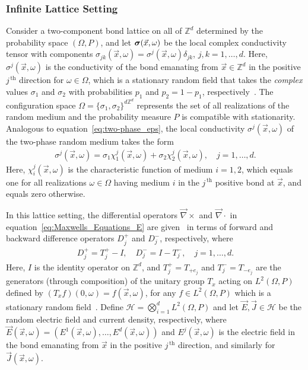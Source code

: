 \documentclass{cmslatex}
\newcommand\bsig{\mbox{\boldmath${\sigma}$}}
\begin{document}
\subsubsection{Infinite Lattice Setting}
\label{sec:Infinite_Lattice_Setting}
%
Consider a two-component bond lattice on all of $\mathbb{Z}^d$
determined by the probability space $(\Omega,P)$, and let
$\bsig(\vec{x},\omega)$ be the local complex conductivity tensor with
components $\sigma_{jk}(\vec{x},\omega)=\sigma^j(\vec{x},\omega)\delta_{jk}$, $j,k=1,\ldots,d$. Here,
$\sigma^j(\vec{x},\omega)$ is the conductivity of the bond emanating from 
$\vec{x}\in\mathbb{Z}^d$ in the positive $j^{\,\text{th}}$ direction for
$\omega\in\Omega$, which is a stationary random field that takes the
\emph{complex} values $\sigma_1$ and $\sigma_2$ with probabilities $p_1$ and
$p_2=1-p_1$, respectively~\cite{Golden:CMP-467,Bruno:JSP-365}. The
configuration space $\Omega=\{\sigma_1,\sigma_2\}^{d\mathbb{Z}^d}$ represents the set
of all realizations of the random medium and the 
probability measure $P$ is compatible with stationarity. Analogous to
equation~\eqref{eq:two-phase_eps}, the local conductivity
$\sigma^j(\vec{x},\omega)$ of the two-phase random medium takes the
form~\cite{Golden:CMP-467}  
%
\begin{align}\label{eq:two-phase_sigma}
  \sigma^j(\vec{x},\omega)=\sigma_1\chi_1^j(\vec{x},\omega)+\sigma_2\chi_2^j(\vec{x},\omega), \quad j=1,\ldots,d.
\end{align}
%
Here, $\chi_i^j(\vec{x},\omega)$ is the characteristic function of medium
$i=1,2$, which equals one for all realizations $\omega\in\Omega$ having medium $i$
in the $j^{\,\text{th}}$ positive bond at $\vec{x}$, and equals zero
otherwise.




In this lattice setting, the differential operators $\vec{\nabla}\times$ and
$\vec{\nabla}\cdot$ in equation~\eqref{eq:Maxwells_Equations_E} are
given~\cite{Golden:CMP-467,Bruno:JSP-365} in terms of forward and
backward difference operators $D_j^+$ and $D_j^-$, respectively, where
%
\begin{align}\label{eq:Difference_Operators}
  D_j^+=T_j^+-I, \quad D_j^-=I-T_j^-, \quad j=1,\ldots,d.
\end{align}
%
Here, $I$ is the identity operator on $\mathbb{Z}^d$, and 
$T_j^+=T_{+e_j}$ and $T_j^-=T_{-e_j}$ are the generators (through 
composition) of the unitary group $T_x$ acting on $L^2(\Omega,P)$ defined
by $(T_xf)(0,\omega)=f(\vec{x},\omega)$, for any $f\in L^2(\Omega,P)$
which is a stationary random field~\cite{Golden:CMP-467}. Define
$\mathscr{H}=\bigotimes_{i=1}^dL^2(\Omega,P)$ and let 
$\vec{E},\vec{J}\in \mathscr{H}$ be  
the random electric field and current density,
respectively, where
$\vec{E}(\vec{x},\omega)=(E^1(\vec{x},\omega),\ldots,E^d(\vec{x},\omega))$ and
$E^j(\vec{x},\omega)$ is the electric field in the bond emanating from
$\vec{x}$ in the positive $j^{\,\text{th}}$ direction, and similarly
for $\vec{J}(\vec{x},\omega)$.  
\end{document}
